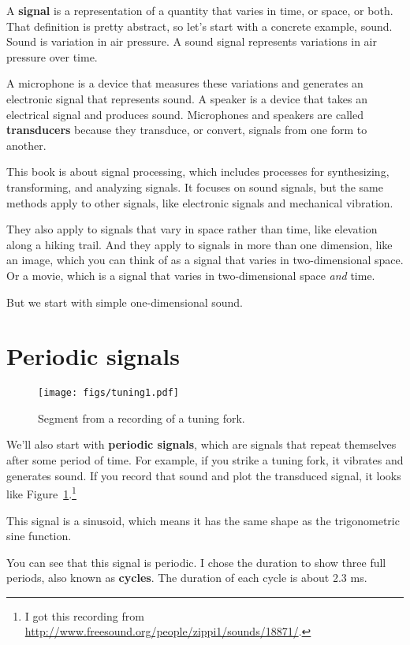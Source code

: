 \documentclass[12pt]{book}
\begin{document}
A {\bf signal} is a representation of a quantity that varies in time,
or space, or both.  That definition is pretty abstract, so let's start
with a concrete example, sound.  Sound is variation in air pressure.
A sound signal represents variations in air pressure over time.

A microphone is a device that measures these variations and generates
an electronic signal that represents sound.  A speaker is a device
that takes an electrical signal and produces sound.
Microphones and speakers are called {\bf transducers} because they
transduce, or convert, signals from one form to another.

This book is about signal processing, which includes processes for
synthesizing, transforming, and analyzing signals.  It focuses on
sound signals, but the same methods apply to other signals, like
electronic signals and mechanical vibration.

They also apply to signals that vary in space rather than time, like
elevation along a hiking trail.  And they apply to signals in more
than one dimension, like an image, which you can think of as a signal
that varies in two-dimensional space.  Or a movie, which is
a signal that varies in two-dimensional space {\it and} time.

But we start with simple one-dimensional sound.


\section{Periodic signals}

\begin{figure}
\centerline{\texttt{[image: figs/tuning1.pdf]}}
\caption{Segment from a recording of a tuning fork.}
\label{fig.tuning1}
\end{figure}

We'll also start with {\bf periodic signals}, which are signals that
repeat themselves after some period of time.  For example, if you
strike a tuning fork, it vibrates and generates sound.  If you record
that sound and plot the transduced signal, it looks like
Figure~\ref{fig.tuning1}.\footnote{I got this recording from
  \url{http://www.freesound.org/people/zippi1/sounds/18871/}.}

This signal is a sinusoid, which means it has the same shape as
the trigonometric sine function. 

You can see that this signal is periodic.  I chose the duration
to show three full periods, also known as {\bf cycles}.
The duration of each cycle is
about 2.3 ms.
\end{document}
